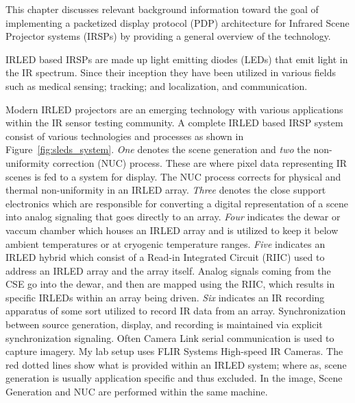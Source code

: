 \label{chap:background}

This chapter discusses relevant background information toward the goal of implementing a packetized display protocol (PDP) architecture for Infrared Scene Projector systems (IRSPs) by providing a general overview of the technology.

IRLED based IRSPs are made up light emitting diodes (LEDs) that emit light in the IR spectrum\cite{biard1966semiconductor}. Since their inception they have been utilized in various fields such as medical sensing\cite{MonteiroEtAl2011,MEEKS1998433,Sadick2009,takhtfooladi2015effects,yamanishi1995respiration}; tracking; and localization\cite{PlotogVladescu2015,Kimon2001,SCHOLZ20151233,WalshDaemsSteckel2015,zeylikovich2003mid}, and communication\cite{CossuEtAl2014,escobosa2004ir,GeorgopoulosKormakopoulos1986,sohn2007localization,JangEtAl2012}.

Modern IRLED projectors are an emerging technology with various applications within the IR sensor testing community. A complete IRLED based IRSP system consist of various technologies and processes as shown in Figure~\ref{fig:sleds_system}. \emph{One} denotes the scene generation and \emph{two} the non-uniformity correction (NUC) process. These are where pixel data representing IR scenes is fed to a system for display. The NUC process corrects for physical and thermal non-uniformity\cite{BarakhshanEtAl2017} in an IRLED array\cite{BarakhshanEtAl2018}. \emph{Three} denotes the close support electronics\cite{ejzak4} which are responsible for converting a digital representation of a scene into analog signaling that goes directly to an array. \emph{Four} indicates the dewar\cite{lang1, MarksEtAl2017} or vaccum chamber which houses an IRLED array and is utilized to keep it below ambient temperatures or at cryogenic temperature ranges. \emph{Five} indicates an IRLED hybrid which consist of a Read-in Integrated Circuit (RIIC)\cite{HernandezEtAl2017} used to address an IRLED array and the array itself. Analog signals coming from the CSE go into the dewar, and then are mapped using the RIIC, which results in specific IRLEDs within an array being driven. \emph{Six} indicates an IR recording apparatus of some sort utilized to record IR data from an array. Synchronization between source generation, display, and recording is maintained via explicit synchronization signaling. Often Camera Link serial communication\cite{CameraLink2000, zhu2008design} is used to capture imagery. My lab setup uses FLIR Systems High-speed IR Cameras\cite{FLIR1, FLIR2, FLIR3}. The red dotted lines show what is provided within an IRLED system; where as, scene generation is usually application specific and thus excluded. In the image, Scene Generation and NUC are performed within the same machine.

